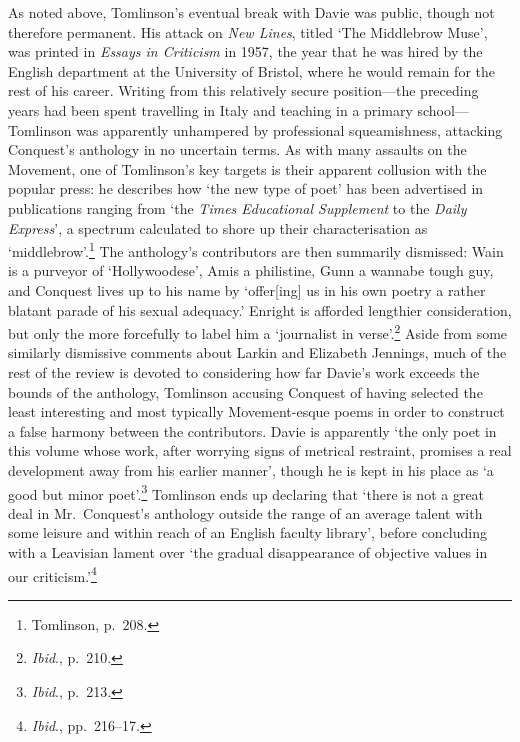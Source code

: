 \documentclass[]{article}
\begin{document}
As noted above, Tomlinson’s eventual break with Davie was public, though
not therefore permanent. His attack on \emph{New Lines}, titled ‘The
Middlebrow Muse’, was printed in \emph{Essays in Criticism} in 1957, the
year that he was hired by the English department at the University of
Bristol, where he would remain for the rest of his career. Writing from
this relatively secure position—the preceding years had been spent
travelling in Italy and teaching in a primary school—Tomlinson was
apparently unhampered by professional squeamishness, attacking
Conquest’s anthology in no uncertain terms. As with many assaults on the
Movement, one of Tomlinson’s key targets is their apparent collusion
with the popular press: he describes how ‘the new type of poet’ has been
advertised in publications ranging from ‘the \emph{Times Educational
Supplement} to the \emph{Daily Express}’, a spectrum calculated to shore
up their characterisation as ‘middlebrow’.\footnote{Tomlinson, p.~208.}
The anthology’s contributors are then summarily dismissed: Wain is a
purveyor of ‘Hollywoodese’, Amis a philistine, Gunn a wannabe tough guy,
and Conquest lives up to his name by ‘offer{[}ing{]} us in his own
poetry a rather blatant parade of his sexual adequacy.’ Enright is
afforded lengthier consideration, but only the more forcefully to label
him a ‘journalist in verse’.\footnote{\emph{Ibid}., p.~210.} Aside from
some similarly dismissive comments about Larkin and Elizabeth Jennings,
much of the rest of the review is devoted to considering how far Davie’s
work exceeds the bounds of the anthology, Tomlinson accusing Conquest of
having selected the least interesting and most typically Movement-esque
poems in order to construct a false harmony between the contributors.
Davie is apparently ‘the only poet in this volume whose work, after
worrying signs of metrical restraint, promises a real development away
from his earlier manner’, though he is kept in his place as ‘a good but
minor poet’.\footnote{\emph{Ibid}., p.~213.} Tomlinson ends up declaring
that ‘there is not a great deal in Mr.~Conquest’s anthology outside the
range of an average talent with some leisure and within reach of an
English faculty library’, before concluding with a Leavisian lament over
‘the gradual disappearance of objective values in our
criticism.’\footnote{\emph{Ibid}., pp.~216–17.}
\end{document}
